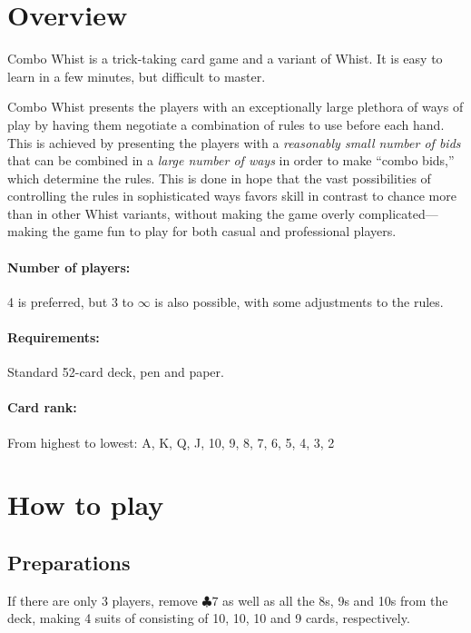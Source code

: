 \documentclass[a4paper]{article}
\author{By Joakim Nilsson}
\date{Development version (based on version \varVersion-\varLanguage)---\today}
\date{Version \varVersion-\varLanguage---\today}
\begin{document}

	\introPages
	\pagebreak


	\section{Overview}
	Combo Whist is a trick-taking card game and a variant of Whist. It is easy to learn in a few minutes, but difficult to master.

	Combo Whist presents the players with an exceptionally large plethora of ways of play by having them negotiate a combination of rules to use before each hand. This is achieved by presenting the players with a \emph{reasonably small number of bids} that can be combined in a \emph{large number of ways} in order to make ``combo bids,'' which determine the rules. This is done in hope that the vast possibilities of controlling the rules in sophisticated ways favors skill in contrast to chance more than in other Whist variants, without making the game overly complicated---making the game fun to play for both casual and professional players.

	\paragraph{Number of players:}
	4 is preferred, but 3 to $\infty$ is also possible, with some adjustments to the rules.

	\paragraph{Requirements:}
	Standard 52-card deck, pen and paper.

	\paragraph{Card rank:}
	From highest to lowest: A, K, Q, J, 10, 9, 8, 7, 6, 5, 4, 3, 2

	\section{How to play}
	\subsection{Preparations}
	If there are only 3 players, remove $\clubsuit 7$ as well as all the 8s, 9s and 10s from the deck, making 4 suits of consisting of 10, 10, 10 and 9 cards, respectively.
\end{document}
